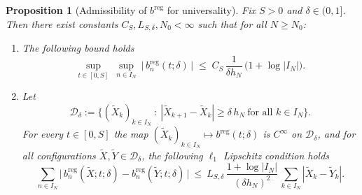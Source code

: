 \documentclass[10pt,a4paper]{amsart}
\newtheorem{prop}{Proposition}
\begin{document}
\begin{prop}[Admissibility of $b^{\mathrm{reg}}$ for universality]
\label{prop:breg-regular-cut}
Fix $S>0$ and $\delta\in(0,1]$. Then there exist constants
$C_{S},L_{S,\delta},N_0<\infty$ such that for all
$N\ge N_0$:

\begin{enumerate}
\item[(i)] The following bound holds 
\begin{equation}\label{eq:breg-sup-cut}
\sup_{t\in[0,S]}\ \sup_{n\in I_N}\ \big|\,b^{\mathrm{reg}}_{n}(t;\delta)\,\big|
\;\le\; C_{S}\,\frac{1}{\delta h_N}\,\big(1+\log |I_N|\big).
\end{equation}

\item[(ii)] Let
\begin{equation}\label{eq:D-delta}
\mathcal D_{\delta}:=\Big\{(\widetilde X_k)_{k\in I_N}\ :\
|\widetilde X_{k+1}-\widetilde X_k|\ge \delta\,h_N\ \text{for all }k\in I_N\Big\}.
\end{equation}
For every $t\in[0,S]$ the map
$(\widetilde X_k)_{k\in I_N}\mapsto b^{\mathrm{reg}}(t;\delta)$ is $C^\infty$
on $\mathcal D_\delta$, and for all configurations
$\widetilde X,\widetilde Y\in\mathcal D_\delta$,  the following $\ell_1$ Lipschitz condition holds
\begin{equation}\label{eq:breg-Lip}
\sum_{n\in I_N}\big|\,b^{\mathrm{reg}}_{n}(\widetilde X;t;\delta)
-b^{\mathrm{reg}}_{n}(\widetilde Y;t;\delta)\,\big|
\ \le\ L_{S,\delta}\,
\frac{1+\log |I_N|}{(\delta h_N)^2}\,
\sum_{k\in I_N}|\widetilde X_k-\widetilde Y_k| .
\end{equation}
\end{enumerate}
\end{prop}
\end{document}

